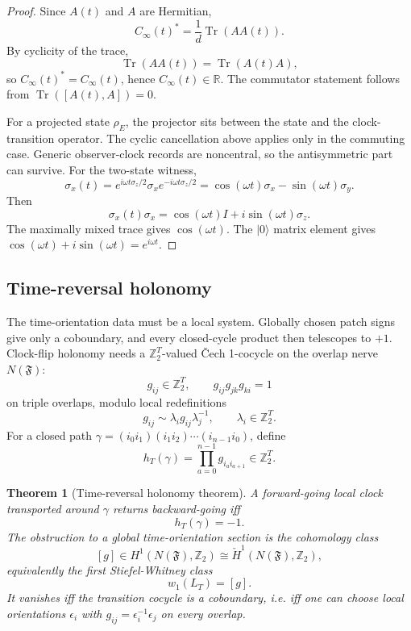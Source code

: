 \documentclass[11pt]{article}
\newtheorem{theorem}{Theorem}[section]
\theoremstyle{remark}
\theoremstyle{plain}
\newcommand{\Tr}{\operatorname{Tr}}
\newcommand{\Z}{\mathbb Z}
\begin{document}
\begin{proof}
Since \(A(t)\) and \(A\) are Hermitian,
\[
C_\infty(t)^*=\frac1d\Tr(A A(t)).
\]
By cyclicity of the trace,
\[
\Tr(A A(t))=\Tr(A(t)A),
\]
so \(C_\infty(t)^*=C_\infty(t)\), hence \(C_\infty(t)\in\mathbb R\). The commutator statement
follows from \(\Tr([A(t),A])=0\).

For a projected state \(\rho_E\), the projector sits between the state and the clock-transition
operator. The cyclic cancellation above applies only in the commuting case. Generic observer-clock
records are noncentral, so the antisymmetric part can survive. For the two-state witness,
\[
\sigma_x(t)=e^{i\omega t\sigma_z/2}\sigma_xe^{-i\omega t\sigma_z/2}
=\cos(\omega t)\sigma_x-\sin(\omega t)\sigma_y.
\]
Then
\[
\sigma_x(t)\sigma_x=\cos(\omega t)I+i\sin(\omega t)\sigma_z.
\]
The maximally mixed trace gives \(\cos(\omega t)\). The \(|0\rangle\) matrix element gives
\(\cos(\omega t)+i\sin(\omega t)=e^{i\omega t}\).
\end{proof}

\subsection{Time-reversal holonomy}

The time-orientation data must be a local system. Globally chosen patch signs give only a
coboundary, and every closed-cycle product then telescopes to \(+1\). Clock-flip holonomy needs a
\(\Z_2^T\)-valued \v{C}ech 1-cocycle on the overlap nerve \(N(\mathfrak F)\):
\[
g_{ij}\in \Z_2^T,\qquad g_{ij}g_{jk}g_{ki}=1
\]
on triple overlaps, modulo local redefinitions
\[
g_{ij}\sim \lambda_i g_{ij}\lambda_j^{-1},\qquad \lambda_i\in\Z_2^T.
\]
For a closed path \(\gamma=(i_0i_1)(i_1i_2)\cdots(i_{n-1}i_0)\), define
\[
h_T(\gamma)=\prod_{a=0}^{n-1}g_{i_a i_{a+1}}\in\Z_2^T.
\]

\begin{theorem}[Time-reversal holonomy theorem]
A forward-going local clock transported around \(\gamma\) returns backward-going iff
\[
h_T(\gamma)=-1.
\]
The obstruction to a global time-orientation section is the cohomology class
\[
[g]\in H^1(N(\mathfrak F),\Z_2)\cong \check H^1(N(\mathfrak F),\Z_2),
\]
equivalently the first Stiefel-Whitney class
\[
w_1(L_T)=[g].
\]
It vanishes iff the transition cocycle is a coboundary, i.e. iff one can choose local orientations
\(\epsilon_i\) with \(g_{ij}=\epsilon_i^{-1}\epsilon_j\) on every overlap.
\end{theorem}
\end{document}
